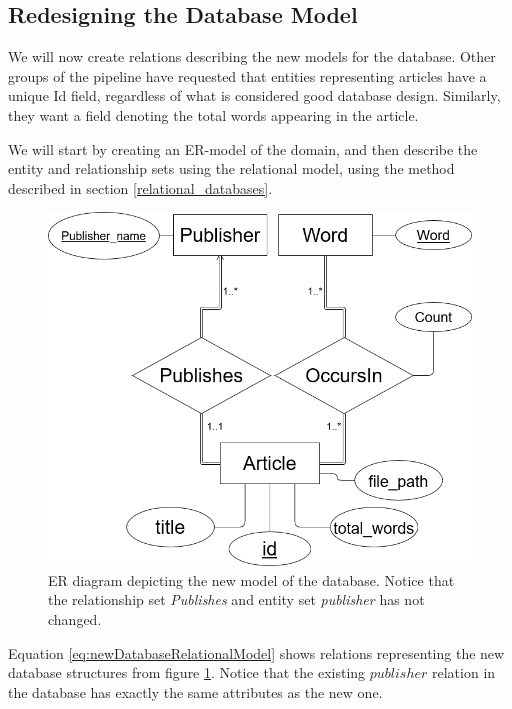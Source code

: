 \subsection{Redesigning the Database Model}\label{databaseModelRedesignNF}
We will now create relations describing the new models for the database.
Other groups of the \knox{} pipeline have requested that entities representing articles have a unique Id field, regardless of what is considered good database design.
Similarly, they want a field denoting the total words appearing in the article.

We will start by creating an ER-model of the domain, and then describe the entity and relationship sets using the relational model, using the method described in section \ref{relational_databases}.

\begin{figure}[H]
    \centering
    \includegraphics[scale=0.35]{Images/FinalERDiagram.png}
    \caption{ER diagram depicting the new model of the database. Notice that the relationship set \textit{Publishes} and entity set \textit{publisher} has not changed.}
    \label{fig:newdatabaseRedesignER}
\end{figure}

Equation \ref{eq:newDatabaseRelationalModel} shows relations representing the new database structures from figure \ref{fig:newdatabaseRedesignER}.
Notice that the existing $publisher$ relation in the database has exactly the same attributes as the new one. 

